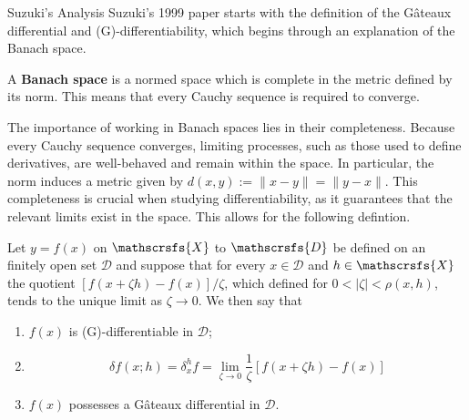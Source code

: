 \documentclass[aspectratio=169]{beamer}
\begin{document}
	\begin{frame}[allowframebreaks]{Suzuki's Analysis}
		Suzuki's 1999 paper starts with the definition of the Gâteaux differential and (G)-differentiability, which begins through an explanation of the Banach space. 
		
		\begin{definition}
			A \textbf{Banach space }is a normed space which is complete in the metric defined by its norm. This means that every Cauchy sequence is required to converge.
		\end{definition}
		The importance of working in Banach spaces lies in their completeness. Because every Cauchy sequence converges, limiting processes, such as those used to define derivatives, are well-behaved and remain within the space. In particular, the norm induces a metric given by $  d(x,y) := \|x - y\| = \|y - x\|  $. This completeness is crucial when studying differentiability, as it guarantees that the relevant limits exist in the space. This allows for the following defintion.
		\begin{definition}
			Let $y=f(x)$ on $\mathscrsfs{X}$ to $\mathscrsfs{D}$ be defined on an finitely open set $\mathcal{D}$ and suppose that for every $x\in\mathcal{D}$ and $h\in\mathscrsfs{X}$ the quotient $[f(x+\zeta h)-f(x)]/\zeta$, which defined for $0<|\zeta|<\rho(x,h)$, tends to the unique limit as $\zeta\to0$. We then say that
			\begin{enumerate}
				\item $f(x)$ is (G)-differentiable in $\mathcal{D}$;
				\item \begin{equation}
					\delta f(x;h)=\delta_x^hf=\lim_{\zeta\to0}\frac{1}{\zeta}[f(x+\zeta h)-f(x)]
				\end{equation}
				\item $f(x)$ possesses a Gâteaux differential in $\mathcal{D}$.
			\end{enumerate}
		\end{definition}
		

\end{frame}
\end{document}
